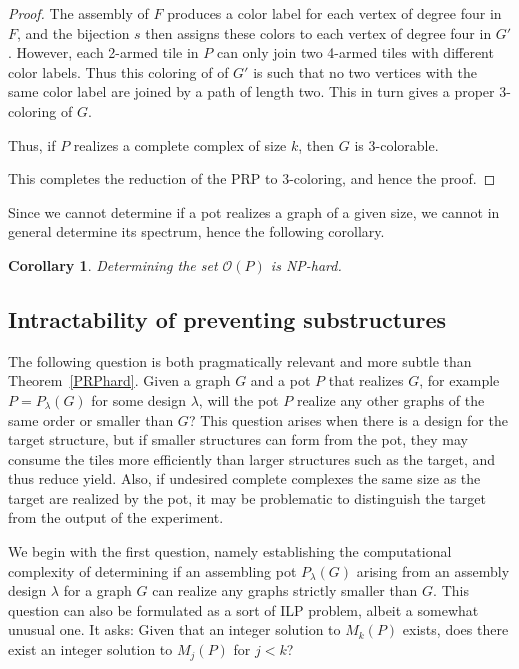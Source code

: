 \documentclass{elsarticle}
\newtheorem{corollary}[theorem]{Corollary}
\theoremstyle{definition}
\theoremstyle{remark}
\theoremstyle{plain}
\theoremstyle{plain}
\begin{document}
\begin{proof}
The assembly of $F$ produces a color label for each vertex of degree four in $F$, and the bijection $s$ then assigns these colors to each vertex of degree four in $G'$.  However, each 2-armed tile in $P$ can only join two 4-armed tiles with different color labels.  Thus this coloring of of $G'$ is such that no two vertices with the same color label are joined by a path of length two. This in turn gives a proper 3-coloring of $G$. 

Thus, if $P$ realizes a complete complex of size $k$, then $G$ is 3-colorable.

This completes the reduction of the PRP to 3-coloring, and hence the proof.
\end{proof}
 Since we cannot determine if a pot realizes a graph of a given size, we cannot in general determine its spectrum, hence the following corollary.

\begin{corollary}Determining the set $\mathcal{O}(P)$ is NP-hard.  \end{corollary}

\subsection{Intractability of preventing substructures}

The following question is both pragmatically relevant and more subtle than Theorem~\ref{PRPhard}. Given a graph $G$ and a pot $P$ that realizes $G$, for example $P=P_{\lambda}(G)$ for some design $\lambda$, will the pot $P$ realize any other graphs of the same order or smaller than $G$?  This question arises when there is a design for the target structure, but if smaller structures can form from the pot, they may consume the tiles more efficiently than larger structures such as the target, and thus reduce yield.  Also, if undesired complete complexes the same size as the target are realized by the pot, it may be problematic to distinguish the target from the output of the experiment.  

We begin with the first question, namely establishing the computational complexity of determining if an assembling pot $P_{\lambda}(G)$ arising from an assembly design $\lambda$ for a graph $G$ can realize any graphs strictly smaller than $G$.  This question can also be formulated as a sort of ILP problem, albeit a somewhat unusual one.  It asks:  Given that an integer solution to $M_k(P)$ exists, does there exist an integer solution to $M_j(P)$ for $j<k$?
\end{document}
